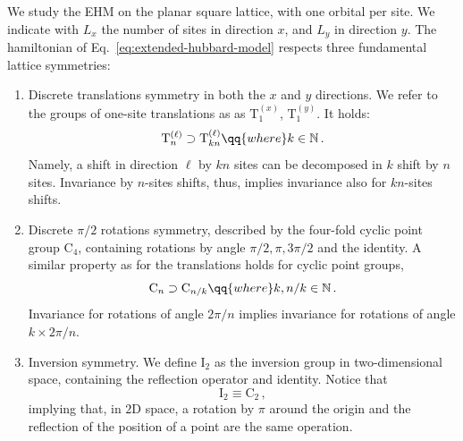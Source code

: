 We study the EHM on the planar square lattice, with one orbital per site. We indicate with $L_x$ the number of sites in direction $x$, and $L_y$ in direction $y$. The hamiltonian of Eq.~\eqref{eq:extended-hubbard-model} respects three fundamental lattice symmetries:
\begin{enumerate}
	\item Discrete translations symmetry in both the $x$ and $y$ directions. We refer to the groups of one-site translations as as $\mathrm{T}_1^{(x)}$, $\mathrm{T}_1^{(y)}$. It holds:
	\begin{equation}\label{eq:ehm-Tn-Tkn}
		\mathrm{T}_n^{(\ell)} \supset \mathrm{T}_{kn}^{(\ell)}
		\qq{where}
		k\in\mathbb{N} \, .
	\end{equation}
	Namely, a shift in direction $\ell$ by $kn$ sites can be decomposed in $k$ shift by $n$ sites. Invariance by $n$-sites shifts, thus, implies invariance also for $kn$-sites shifts.
	\item Discrete $\pi/2$ rotations symmetry, described by the four-fold cyclic point group $\mathrm{C}_4$, containing rotations by angle $\pi/2, \pi, 3\pi/2$ and the identity. A similar property as for the translations holds for cyclic point groups,
	\begin{equation}\label{eq:ehm-Cn-Cn/k}
		\mathrm{C}_n \supset \mathrm{C}_{n/k}
		\qq{where}
		k, n/k \in\mathbb{N} \, .
	\end{equation}
	Invariance for rotations of angle $2\pi/n$ implies invariance for rotations of angle $k \times 2\pi/n$.
	\item Inversion symmetry. We define $\mathrm{I}_2$ as the inversion group in two-dimensional space, containing the reflection operator and identity. Notice that
	\begin{equation}\label{eq:ehm-I2-C2}
		\mathrm{I}_2 \equiv \mathrm{C}_2 \, ,
	\end{equation}
	implying that, in $2$D space, a rotation by $\pi$ around the origin and the reflection of the position of a point are the same operation.
\end{enumerate}

